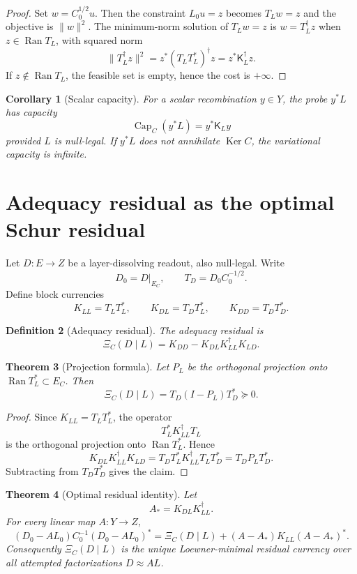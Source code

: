\documentclass[11pt]{article}
\newtheorem{theorem}{Theorem}[section]
\newtheorem{corollary}[theorem]{Corollary}
\newtheorem{definition}[theorem]{Definition}
\DeclareMathOperator{\Ran}{Ran}
\DeclareMathOperator{\Ker}{Ker}
\DeclareMathOperator{\Capa}{Cap}
\newcommand{\K}{\mathsf K}
\newcommand{\XiR}{\Xi}
\begin{document}
\begin{proof}
Set $w=C_0^{1/2}u$.  Then the constraint $L_0u=z$ becomes $T_Lw=z$ and the objective is $\|w\|^2$.  The minimum-norm solution of $T_Lw=z$ is $w=T_L^\dagger z$ when $z\in\Ran T_L$, with squared norm
\[
  \|T_L^\dagger z\|^2=z^*(T_LT_L^*)^\dagger z=z^*\K_L^\dagger z.
\]
If $z\notin\Ran T_L$, the feasible set is empty, hence the cost is $+\infty$.
\end{proof}

\begin{corollary}[Scalar capacity]
For a scalar recombination $y\in Y$, the probe $y^*L$ has capacity
\[
  \Capa_C(y^*L)=y^*\K_Ly
\]
provided $L$ is null-legal.  If $y^*L$ does not annihilate $\Ker C$, the variational capacity is infinite.
\end{corollary}

\section{Adequacy residual as the optimal Schur residual}

Let $D:E\to Z$ be a layer-dissolving readout, also null-legal.  Write
\[
  D_0=D|_{E_C},
  \qquad
  T_D=D_0C_0^{-1/2}.
\]
Define block currencies
\[
  K_{LL}=T_LT_L^*,\qquad
  K_{DL}=T_DT_L^*,\qquad
  K_{DD}=T_DT_D^*.
\]

\begin{definition}[Adequacy residual]
The adequacy residual is
\[
  \boxed{\XiR_C(D\mid L)=K_{DD}-K_{DL}K_{LL}^\dagger K_{LD}.}
\]
\end{definition}

\begin{theorem}[Projection formula]
Let $P_L$ be the orthogonal projection onto $\Ran T_L^*\subset E_C$.  Then
\[
  \boxed{\XiR_C(D\mid L)=T_D(I-P_L)T_D^*\succeq0.}
\]
\end{theorem}

\begin{proof}
Since $K_{LL}=T_LT_L^*$, the operator
\[
  T_L^*K_{LL}^\dagger T_L
\]
\noindent is the orthogonal projection onto $\Ran T_L^*$.  Hence
\[
  K_{DL}K_{LL}^\dagger K_{LD}=T_DT_L^*K_{LL}^\dagger T_LT_D^*=T_DP_LT_D^*.
\]
Subtracting from $T_DT_D^*$ gives the claim.
\end{proof}

\begin{theorem}[Optimal residual identity]
Let
\[
  A_*=K_{DL}K_{LL}^\dagger.
\]
For every linear map $A:Y\to Z$,
\[
  (D_0-AL_0)C_0^{-1}(D_0-AL_0)^*
  =\XiR_C(D\mid L)+(A-A_*)K_{LL}(A-A_*)^*.
\]
Consequently $\XiR_C(D\mid L)$ is the unique Loewner-minimal residual currency over all attempted factorizations $D\approx AL$.
\end{theorem}
\end{document}
